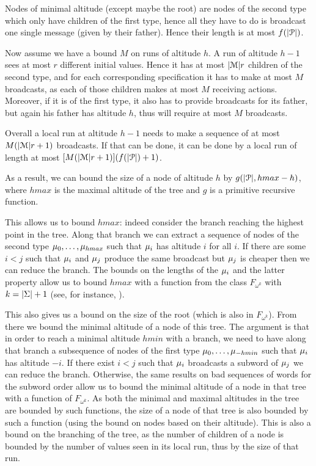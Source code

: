  Nodes of minimal altitude (except maybe the root) are nodes of the second type which only have children of the first type, hence all they have to do is broadcast one single message (given by their father). Hence their length is at most $f(|\mathcal{P}|)$. 
 
 Now assume we have a bound $M$ on runs of altitude $h$. A run of altitude $h-1$ sees at most $r$ different initial values. Hence it has at most $|\mathcal{M}|r$ children of the second type, and for each corresponding specification it has to make at most $M$ broadcasts, as each of those children makes at most $M$ receiving actions.
 Moreover, if it is of the first type, it also has to provide broadcasts for its father, but again his father has altitude $h$, thus will require at most $M$ broadcasts.
 
 Overall a local run at altitude $h-1$ needs to make a sequence of at most $M(|\mathcal{M}| r +1)$ broadcasts. If that can be done, it can be done by a local run of length at most $[M(|\mathcal{M}| r +1)](f(|\mathcal{P}|)+1)$.
 
 As a result, we can bound the size of a node of altitude $h$ by $g(|\mathcal{P}|, hmax-h)$, where $hmax$ is the maximal altitude of the tree and $g$ is a primitive recursive function.
 
 This allows us to bound $hmax$: indeed consider the branch reaching the highest point in the tree. Along that branch we can extract a sequence of nodes of the second type $\mu_0, \ldots, \mu_{hmax}$ such that $\mu_i$ has altitude $i$ for all $i$. If there are some $i<j$ such that $\mu_i$ and $\mu_j$ produce the same broadcast but $\mu_j$ is cheaper then we can reduce the branch.
 The bounds on the lengths of the $\mu_i$ and the latter property allow us to bound $hmax$ with a function from the class $F_{\omega^k}$ with $k = |\Sigma| +1$ (see, for instance, \cite{SchmitzS2011upperHigman}).
 
 This also gives us a bound on the size of the root (which is also in $F_{\omega^k}$). From there we bound the minimal altitude of a node of this tree. The argument is that in order to reach a minimal altitude $hmin$ with a branch, we need to have along that branch a subsequence of nodes of the first type $\mu_0, \ldots, \mu_{-hmin}$ such that $\mu_i$ has altitude $-i$. If there exist $i<j$ such that $\mu_i$ broadcasts a subword of $\mu_j$ we can reduce the branch. Otherwise, the same results on bad sequences of words  for the subword order allow us to bound the minimal altitude of a node in that tree with a function of $F_{\omega^k}$.
 As both the minimal and maximal altitudes in the tree are bounded by such functions, the size of a node of that tree is also bounded by such a function (using the bound on nodes based on their altitude). This is also a bound on the branching of the tree, as the number of children of a node is bounded by the number of values seen in its local run, thus by the size of that run.
 
